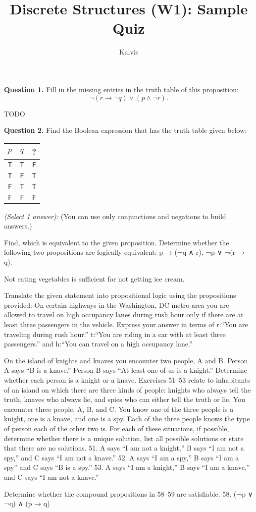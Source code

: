 \documentclass[jou]{apa6}
\title{Discrete Structures (W1): Sample Quiz}
\author{Kalvis}
\affiliation{RBS}
\begin{document}
\maketitle

{\bf Question 1.} Fill in the missing entries in the truth table of this proposition:
$$\neg(r \rightarrow \neg q) \vee (p \wedge \neg r).$$

TODO

{\bf Question 2.} Find the Boolean expression that has the truth table given below:

\begin{tabular}{ c | c | c }
$p$ & $q$ & ? \\ \hline
{\tt T} & {\tt T} & {\tt F} \\ \hline
{\tt T} & {\tt F} & {\tt T} \\ \hline
{\tt F} & {\tt T} & {\tt T} \\ \hline
{\tt F} & {\tt F} & {\tt F} \\ \hline
\end{tabular}

{\em (Select 1 answer):}
(You can use only conjunctions and negations to build answers.)



Find, which is equivalent to the given proposition. 
Determine whether the following two propositions are logically equivalent: p → (¬q ∧ r), ¬p ∨ ¬(r → q).



Not eating vegetables is sufficient for not getting ice cream. 





Translate the given statement into propositional logic using the propositions provided: On certain highways
in the Washington, DC metro area you are allowed to travel on high occupancy lanes during rush hour only
if there are at least three passengers in the vehicle. Express your answer in terms of r:“You are traveling
during rush hour.” t:“You are riding in a car with at least three passengers.” and h:“You can travel on a high
occupancy lane.”




On the island of knights and knaves you encounter two people, A and B. Person A says “B is a knave.”
Person B says “At least one of us is a knight.” Determine whether each person is a knight or a knave.
Exercises 51–53 relate to inhabitants of an island on which there are three kinds of people: knights who always
tell the truth, knaves who always lie, and spies who can either tell the truth or lie. You encounter three people,
A, B, and C. You know one of the three people is a knight, one is a knave, and one is a spy. Each of the three
people knows the type of person each of the other two is. For each of these situations, if possible, determine
whether there is a unique solution, list all possible solutions or state that there are no solutions.
51. A says “I am not a knight,” B says “I am not a spy,” and C says “I am not a knave.”
52. A says “I am a spy,” B says “I am a spy” and C says “B is a spy.”
53. A says “I am a knight,” B says “I am a knave,” and C says “I am not a knave.”



Determine whether the compound propositions in 58–59 are satisfiable.
58. (¬p ∨ ¬q) ∧ (p → q)
\end{document}
